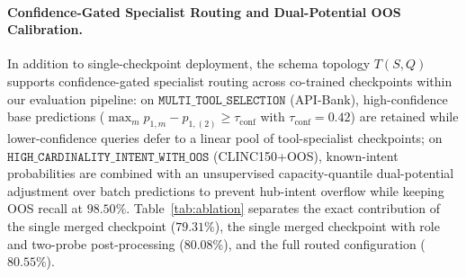\documentclass[10pt,twocolumn]{article}
\begin{document}
\paragraph{Confidence-Gated Specialist Routing and Dual-Potential OOS Calibration.}
In addition to single-checkpoint deployment, the schema topology $T(S, Q)$ supports confidence-gated specialist routing across co-trained checkpoints within our evaluation pipeline: on $\texttt{MULTI\_TOOL\_SELECTION}$ (API-Bank), high-confidence base predictions ($\max_m p_{1,m} - p_{1,(2)} \ge \tau_{\text{conf}}$ with $\tau_{\text{conf}} = 0.42$) are retained while lower-confidence queries defer to a linear pool of tool-specialist checkpoints; on $\texttt{HIGH\_CARDINALITY\_INTENT\_WITH\_OOS}$ (CLINC150+OOS), known-intent probabilities are combined with an unsupervised capacity-quantile dual-potential adjustment over batch predictions to prevent hub-intent overflow while keeping OOS recall at $98.50\%$. Table~\ref{tab:ablation} separates the exact contribution of the single merged checkpoint ($79.31\%$), the single merged checkpoint with role and two-probe post-processing ($80.08\%$), and the full routed configuration ($80.55\%$).
\end{document}
